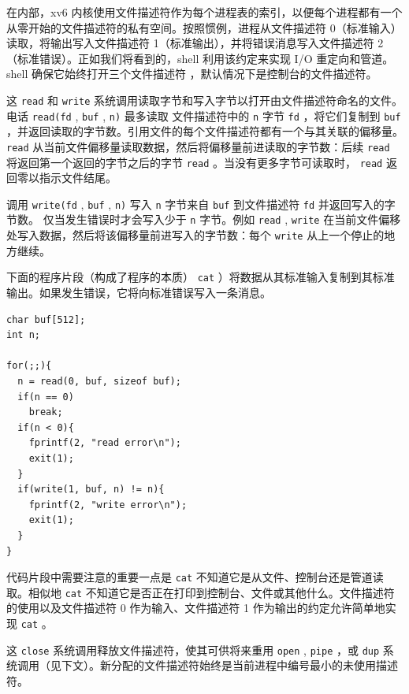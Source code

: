在内部，xv6 内核使用文件描述符作为每个进程表的索引，以便每个进程都有一个从零开始的文件描述符的私有空间。按照惯例，进程从文件描述符 0（标准输入）读取，将输出写入文件描述符 1（标准输出），并将错误消息写入文件描述符 2（标准错误）。正如我们将看到的，shell 利用该约定来实现 I/O 重定向和管道。 shell 确保它始终打开三个文件描述符
        ，默认情况下是控制台的文件描述符。  

这
    \lstinline{read}    和
    \lstinline{write}    系统调用读取字节和写入字节以打开由文件描述符命名的文件。电话
    \lstinline{read(fd}    ,
    \lstinline{buf}    ,
    \lstinline{n)}    最多读取
 文件描述符中的    \lstinline{n}    字节
    \lstinline{fd}    ，将它们复制到
    \lstinline{buf}    ，并返回读取的字节数。引用文件的每个文件描述符都有一个与其关联的偏移量。
    \lstinline{read}    从当前文件偏移量读取数据，然后将偏移量前进读取的字节数：后续
    \lstinline{read}    将返回第一个返回的字节之后的字节
    \lstinline{read}    。当没有更多字节可读取时，
    \lstinline{read}    返回零以指示文件结尾。  

调用
    \lstinline{write(fd}    ,
    \lstinline{buf}    ,
    \lstinline{n)}    写入
    \lstinline{n}    字节来自
    \lstinline{buf}    到文件描述符
    \lstinline{fd}    并返回写入的字节数。
 仅当发生错误时才会写入少于    \lstinline{n}    字节。例如
    \lstinline{read}    ,
    \lstinline{write}    在当前文件偏移处写入数据，然后将该偏移量前进写入的字节数：每个
    \lstinline{write}    从上一个停止的地方继续。  

下面的程序片段（构成了程序的本质）
    \lstinline{cat}    ）将数据从其标准输入复制到其标准输出。如果发生错误，它将向标准错误写入一条消息。
\begin{lstlisting}[]
char buf[512];
int n;

for(;;){
  n = read(0, buf, sizeof buf);
  if(n == 0)
    break;
  if(n < 0){
    fprintf(2, "read error\n");
    exit(1);
  }
  if(write(1, buf, n) != n){
    fprintf(2, "write error\n");
    exit(1);
  }
}
\end{lstlisting}   代码片段中需要注意的重要一点是
    \lstinline{cat}    不知道它是从文件、控制台还是管道读取。相似地
    \lstinline{cat}    不知道它是否正在打印到控制台、文件或其他什么。文件描述符的使用以及文件描述符 0 作为输入、文件描述符 1 作为输出的约定允许简单地实现
    \lstinline{cat}    。  

这
    \lstinline{close}    系统调用释放文件描述符，使其可供将来重用
    \lstinline{open}    ,
    \lstinline{pipe}   ，或
    \lstinline{dup}    系统调用（见下文）。新分配的文件描述符始终是当前进程中编号最小的未使用描述符。  

